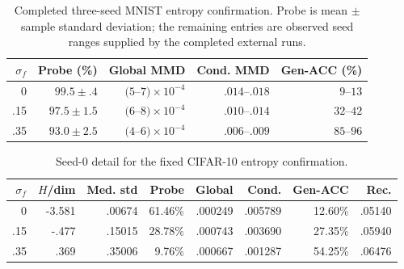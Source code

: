 \begin{table}[ht]
\caption{Complete MNIST entropy sweep.  Median standard deviation is the
effective posterior value; floor hit refers to the raw log-variance head.}
\label{tab:entropy-mnist-full}
\centering
\scriptsize
\setlength{\tabcolsep}{3.2pt}
\end{table}

\begin{table}[ht]
\caption{Completed three-seed MNIST entropy confirmation.  Probe is mean
$\pm$ sample standard deviation; the remaining entries are observed seed
ranges supplied by the completed external runs.}
\label{tab:entropy-mnist-aggregate}
\centering
\small
\setlength{\tabcolsep}{5pt}
\begin{tabular}{rrrrr}
\toprule
$\sigma_f$ & Probe (\%) & Global MMD & Cond. MMD & Gen-ACC (\%) \\
\midrule
0 & $99.5\!\pm\!.4$ & $(5$--$7)\!\times\!10^{-4}$ & $.014$--$.018$ & $9$--$13$ \\
.15 & $97.5\!\pm\!1.5$ & $(6$--$8)\!\times\!10^{-4}$ & $.010$--$.014$ & $32$--$42$ \\
.35 & $93.0\!\pm\!2.5$ & $(4$--$6)\!\times\!10^{-4}$ & $.006$--$.009$ & $85$--$96$ \\
\bottomrule
\end{tabular}
\end{table}

\begin{table}[ht]
\caption{Seed-0 detail for the fixed CIFAR-10 entropy confirmation.}
\label{tab:entropy-cifar-full}
\centering
\scriptsize
\setlength{\tabcolsep}{3.2pt}
\begin{tabular}{rrrrrrrr}
\toprule
$\sigma_f$ & $H$/dim & Med. std & Probe & Global & Cond. & Gen-ACC & Rec. \\
\midrule
0 & -3.581 & .00674 & 61.46\% & .000249 & .005789 & 12.60\% & .05140 \\
.15 & -.477 & .15015 & 28.78\% & .000743 & .003690 & 27.35\% & .05940 \\
.35 & .369 & .35006 & 9.76\% & .000667 & .001287 & 54.25\% & .06476 \\
\bottomrule
\end{tabular}
\end{table}


